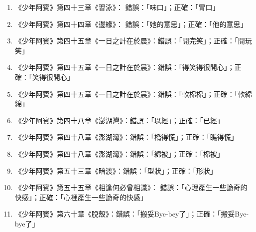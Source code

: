 \begin{enumerate}
\item 《少年阿賓》第四十三章《習泳》： 錯誤：「味口」；正確：「胃口」
\item 《少年阿賓》第四十四章《邊緣》： 錯誤：「她的意思」；正確：「他的意思」
\item 《少年阿賓》第四十五章《一日之計在於晨》：錯誤：「開完笑」；正確：「開玩笑」
\item 《少年阿賓》第四十五章《一日之計在於晨》：錯誤：「得笑得很開心」；正確：「笑得很開心」
\item 《少年阿賓》第四十五章《一日之計在於晨》：錯誤：「軟棉棉」；正確：「軟綿綿」
\item《少年阿賓》第四十八章《澎湖灣》：錯誤：「以經」；正確：「已經」
\item《少年阿賓》第四十八章《澎湖灣》：錯誤：「橋得慌」；正確：「瞧得慌」
\item《少年阿賓》第四十八章《澎湖灣》：錯誤：「綿被」；正確：「棉被」
\item《少年阿賓》第五十三章《暗渡》：錯誤：「型狀」；正確：「形狀」
\item 《少年阿賓》第五十五章《相逢何必曾相識》： 錯誤：「心理產生一些詭奇的快感」；正確：「心裡產生一些詭奇的快感」
\item 《少年阿賓》第六十章《脫殼》：錯誤：「搬妥Bye-bey了」；正確：「搬妥Bye-bye了」
\end{enumerate}

